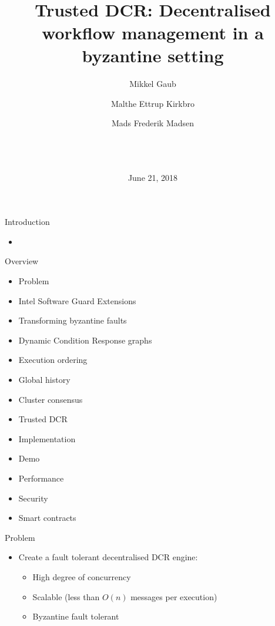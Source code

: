 \documentclass{beamer}
\title{~\\ ~\\ ~\\ Trusted DCR: Decentralised workflow management in a byzantine setting}
\author{Mikkel Gaub \and Malthe Ettrup Kirkbro \and Mads Frederik Madsen}
\date{~\\ ~\\ ~\\ \center June 21, 2018 }
\begin{document}
\maketitle

\begin{frame}{Introduction}%
%
    \begin{itemize}
    	\item
    \end{itemize}
\end{frame}

\begin{frame}{Overview}%
	\begin{itemize}
\item Problem
\item Intel Software Guard Extensions
\item Transforming byzantine faults
\item Dynamic Condition Response graphs
\item Execution ordering
\item Global history
\item Cluster consensus
\item Trusted DCR
\item Implementation
\item Demo
\item Performance
\item Security
\item Smart contracts
	\end{itemize}
\end{frame}

\begin{frame}{Problem}%
\begin{itemize}
	\item Create a fault tolerant decentralised DCR engine:

	\vfill

	\begin{itemize}
		\item High degree of concurrency

		\vfill

		\item Scalable (less than $O(n)$ messages per execution)

		\vfill

		\item Byzantine fault tolerant
	\end{itemize}
\end{itemize}
\end{frame}
\end{document}

